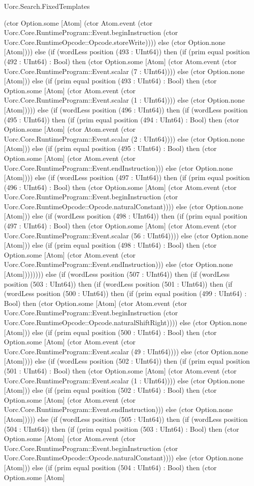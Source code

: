 \begin{lexlean}{Uorc.Search.FixedTemplates}
\begin{semanticmodule}
{(ctor Option.some [Atom] (ctor Atom.event (ctor Uorc.Core.RuntimeProgram::Event.beginInstruction (ctor Uorc.Core.RuntimeOpcode::Opcode.storeWrite)))) else (ctor Option.none [Atom]))) else (if (wordLess position (493 : UInt64)) then (if (prim equal position (492 : UInt64) : Bool) then (ctor Option.some [Atom] (ctor Atom.event (ctor Uorc.Core.RuntimeProgram::Event.scalar (7 : UInt64)))) else (ctor Option.none [Atom])) else (if (prim equal position (493 : UInt64) : Bool) then (ctor Option.some [Atom] (ctor Atom.event (ctor Uorc.Core.RuntimeProgram::Event.scalar (1 : UInt64)))) else (ctor Option.none [Atom])))) else (if (wordLess position (496 : UInt64)) then (if (wordLess position (495 : UInt64)) then (if (prim equal position (494 : UInt64) : Bool) then (ctor Option.some [Atom] (ctor Atom.event (ctor Uorc.Core.RuntimeProgram::Event.scalar (2 : UInt64)))) else (ctor Option.none [Atom])) else (if (prim equal position (495 : UInt64) : Bool) then (ctor Option.some [Atom] (ctor Atom.event (ctor Uorc.Core.RuntimeProgram::Event.endInstruction))) else (ctor Option.none [Atom]))) else (if (wordLess position (497 : UInt64)) then (if (prim equal position (496 : UInt64) : Bool) then (ctor Option.some [Atom] (ctor Atom.event (ctor Uorc.Core.RuntimeProgram::Event.beginInstruction (ctor Uorc.Core.RuntimeOpcode::Opcode.naturalConstant)))) else (ctor Option.none [Atom])) else (if (wordLess position (498 : UInt64)) then (if (prim equal position (497 : UInt64) : Bool) then (ctor Option.some [Atom] (ctor Atom.event (ctor Uorc.Core.RuntimeProgram::Event.scalar (56 : UInt64)))) else (ctor Option.none [Atom])) else (if (prim equal position (498 : UInt64) : Bool) then (ctor Option.some [Atom] (ctor Atom.event (ctor Uorc.Core.RuntimeProgram::Event.endInstruction))) else (ctor Option.none [Atom]))))))) else (if (wordLess position (507 : UInt64)) then (if (wordLess position (503 : UInt64)) then (if (wordLess position (501 : UInt64)) then (if (wordLess position (500 : UInt64)) then (if (prim equal position (499 : UInt64) : Bool) then (ctor Option.some [Atom] (ctor Atom.event (ctor Uorc.Core.RuntimeProgram::Event.beginInstruction (ctor Uorc.Core.RuntimeOpcode::Opcode.naturalShiftRight)))) else (ctor Option.none [Atom])) else (if (prim equal position (500 : UInt64) : Bool) then (ctor Option.some [Atom] (ctor Atom.event (ctor Uorc.Core.RuntimeProgram::Event.scalar (49 : UInt64)))) else (ctor Option.none [Atom]))) else (if (wordLess position (502 : UInt64)) then (if (prim equal position (501 : UInt64) : Bool) then (ctor Option.some [Atom] (ctor Atom.event (ctor Uorc.Core.RuntimeProgram::Event.scalar (1 : UInt64)))) else (ctor Option.none [Atom])) else (if (prim equal position (502 : UInt64) : Bool) then (ctor Option.some [Atom] (ctor Atom.event (ctor Uorc.Core.RuntimeProgram::Event.endInstruction))) else (ctor Option.none [Atom])))) else (if (wordLess position (505 : UInt64)) then (if (wordLess position (504 : UInt64)) then (if (prim equal position (503 : UInt64) : Bool) then (ctor Option.some [Atom] (ctor Atom.event (ctor Uorc.Core.RuntimeProgram::Event.beginInstruction (ctor Uorc.Core.RuntimeOpcode::Opcode.naturalConstant)))) else (ctor Option.none [Atom])) else (if (prim equal position (504 : UInt64) : Bool) then (ctor Option.some [Atom] }
\end{semanticmodule}
\end{lexlean}

